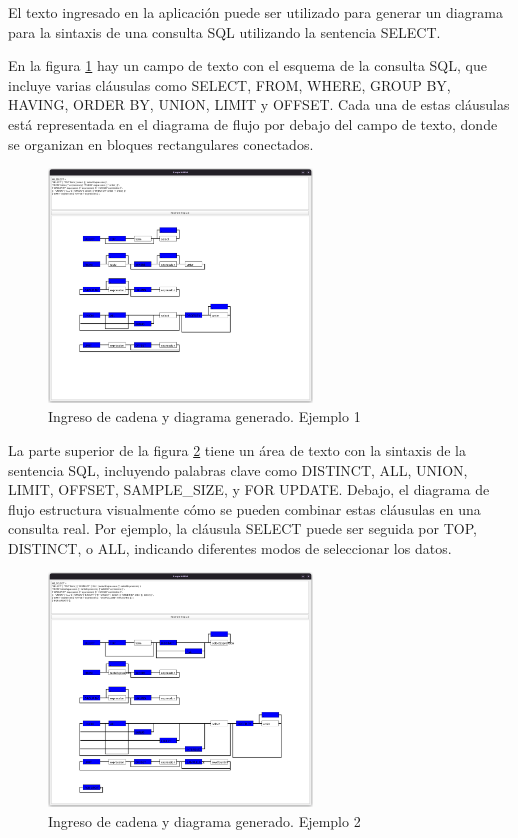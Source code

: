 \documentclass[conference]{IEEEtran}
\begin{document}
El texto ingresado en la aplicación puede ser utilizado para generar un diagrama para la sintaxis de una consulta SQL \cite{sql} utilizando la sentencia SELECT. 

En la figura \ref{fig:ejemplo_1} hay un campo de texto con el esquema de la consulta SQL, que incluye varias cláusulas como SELECT, FROM, WHERE, GROUP BY, HAVING, ORDER BY, UNION, LIMIT y OFFSET. Cada una de estas cláusulas está representada en el diagrama de flujo por debajo del campo de texto, donde se organizan en bloques rectangulares conectados.
\begin{figure} [H]
    \centering
    \includegraphics[width= 7cm]{imagen 2.png}
    \caption{Ingreso de cadena y diagrama generado. Ejemplo 1}
    \label{fig:ejemplo_1}
\end{figure}

La parte superior de la figura \ref{fig:ejemplo_2} tiene un área de texto con la sintaxis de la sentencia SQL, incluyendo palabras clave como DISTINCT, ALL, UNION, LIMIT, OFFSET, SAMPLE\_SIZE, y FOR UPDATE. Debajo, el diagrama de flujo estructura visualmente cómo se pueden combinar estas cláusulas en una consulta real. Por ejemplo, la cláusula SELECT puede ser seguida por TOP, DISTINCT, o ALL, indicando diferentes modos de seleccionar los datos. 

\begin{figure} [H]
    \centering
    \includegraphics[width= 7cm]{imagen 3.png}
    \caption{Ingreso de cadena y diagrama generado. Ejemplo 2}
    \label{fig:ejemplo_2}
\end{figure}
\end{document}
